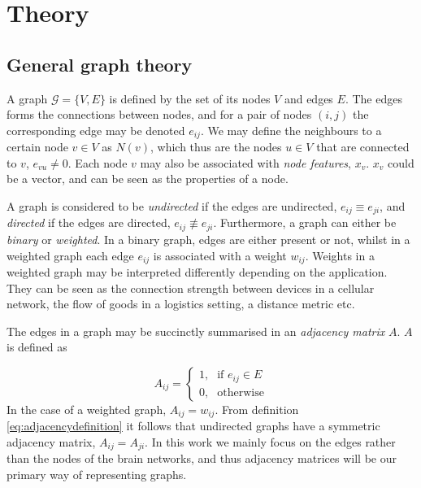 \chapter{Theory}

\section{General graph theory}\label{sec:general_graph_theory}

A graph $\mathcal{G} = \{V, E \} $ is defined by the set of its nodes $V$ and edges $E$. The edges forms the connections between nodes, and for a pair of nodes $(i,j)$ the corresponding edge may be denoted $e_{ij}$. We may define the neighbours to a certain node $v \in V$ as $N(v)$, which thus are the nodes $u \in V$ that are connected to $v$, $e_{vu} \neq 0$. Each node $v$ may also be associated with \textit{node features}, $x_v$. $x_v$ could be a vector, and can be seen as the properties of a node.

A graph is considered to be \textit{undirected} if the edges are undirected, $e_{ij} \equiv e_{ji}$, and \textit{directed} if the edges are directed, $e_{ij} \not\equiv e_{ji}$. Furthermore, a graph can either be \textit{binary} or \textit{weighted}. In a binary graph, edges are either present or not, whilst in a weighted graph each edge $e_{ij}$ is associated with a weight $w_{ij}$. \cite{source} Weights in a weighted graph may be interpreted differently depending on the application. They can be seen as the connection strength between devices in a cellular network, the flow of goods in a logistics setting, a distance metric etc.

The edges in a graph may be succinctly summarised in an \textit{adjacency matrix} $A$. $A$ is defined as

\begin{equation}
    A_{ij} = \begin{cases} \mbox{1,} & \mbox{if } e_{ij} \in E \\ \mbox{0,} & \mbox{otherwise} \end{cases}
    \label{eq:adjacencydefinition}
\end{equation}
In the case of a weighted graph, $A_{ij} = w_{ij}$. From definition \eqref{eq:adjacencydefinition} it follows that undirected graphs have a symmetric adjacency matrix, $A_{ij} = A_{ji}$. In this work we mainly focus on the edges rather than the nodes of the brain networks, and thus adjacency matrices will be our primary way of representing graphs.

